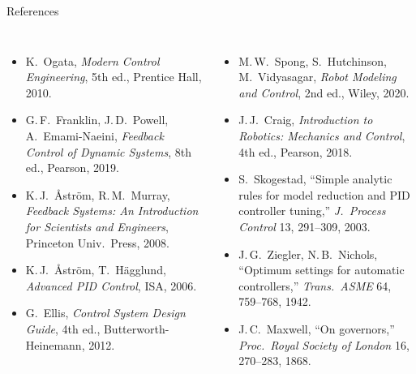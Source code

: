 \documentclass[aspectratio=169,10pt]{beamer}
\begin{document}
\begin{frame}{References}
\fontsize{7}{8.5}\selectfont
\begin{columns}[T]
\begin{itemize}
  \item K.\ Ogata, \emph{Modern Control Engineering}, 5th ed., Prentice Hall, 2010.
  \item G.\,F.\ Franklin, J.\,D.\ Powell, A.\ Emami-Naeini, \emph{Feedback Control of Dynamic Systems}, 8th ed., Pearson, 2019.
  \item K.\,J.\ \AA str\"om, R.\,M.\ Murray, \emph{Feedback Systems: An Introduction for Scientists and Engineers}, Princeton Univ.\ Press, 2008.
  \item K.\,J.\ \AA str\"om, T.\ H\"agglund, \emph{Advanced PID Control}, ISA, 2006.
  \item G.\ Ellis, \emph{Control System Design Guide}, 4th ed., Butterworth-Heinemann, 2012.
\end{itemize}
\begin{itemize}
  \item M.\,W.\ Spong, S.\ Hutchinson, M.\ Vidyasagar, \emph{Robot Modeling and Control}, 2nd ed., Wiley, 2020.
  \item J.\,J.\ Craig, \emph{Introduction to Robotics: Mechanics and Control}, 4th ed., Pearson, 2018.
  \item S.\ Skogestad, ``Simple analytic rules for model reduction and PID controller tuning,'' \emph{J.\ Process Control} 13, 291--309, 2003.
  \item J.\,G.\ Ziegler, N.\,B.\ Nichols, ``Optimum settings for automatic controllers,'' \emph{Trans.\ ASME} 64, 759--768, 1942.
  \item J.\,C.\ Maxwell, ``On governors,'' \emph{Proc.\ Royal Society of London} 16, 270--283, 1868.
\end{itemize}
\end{columns}
\end{frame}
\end{document}
